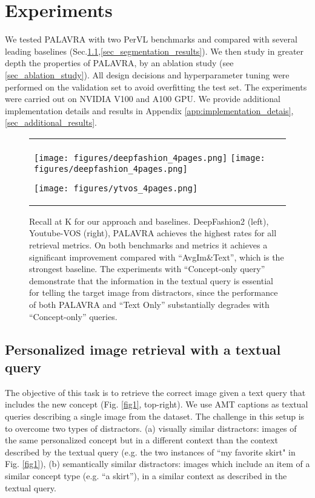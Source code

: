 \documentclass[runningheads]{llncs}
\newcommand{\figref}[1]{Fig. \ref{#1}}
\newcommand{\PerVL}{PerVL {}}
\begin{document}
\section{Experiments}
\label{sec_experiments}
We tested PALAVRA with two \PerVL benchmarks and compared with several leading baselines (Sec.\ref{sec_retrieval_results},\ref{sec_segmentation_results}). We then study in greater depth the properties of PALAVRA, by an ablation study (see \ref{sec_ablation_study}). All design decisions and hyperparameter tuning were performed on the validation set to avoid overfitting the test set. The experiments were carried out on NVIDIA V100 and A100 GPU. We provide additional implementation details and results in Appendix \ref{app:implementation_detais},\ref{sec_additional_results}.


\begin{figure*}[t]
\begin{tabular}{ll}
\texttt{[image: figures/deepfashion\_4pages.png]} \texttt{[image: figures/deepfashion\_4pages.png]} 

\texttt{[image: figures/ytvos\_4pages.png]}&
\end{tabular}
\caption{Recall at K for our approach and baselines.  DeepFashion2 (left), Youtube-VOS (right),
    PALAVRA achieves the highest rates for all retrieval metrics. On both benchmarks and metrics it achieves a significant improvement  compared with ``AvgIm\&Text'', which is the strongest baseline.
    The experiments with ``Concept-only query''  demonstrate that the information in the textual query is essential for telling the target image from distractors, since the performance of both PALAVRA and ``Text Only'' substantially degrades with ``Concept-only'' queries. }
\label{fig_recall_at_k}
\end{figure*}

\subsection{Personalized image retrieval with a textual query}
\label{sec_retrieval_results}
The objective of this task is to retrieve the correct image given a text query that includes the new concept (\figref{fig1}, top-right). We use AMT captions as textual queries describing a single image from the dataset. The challenge in this setup is to overcome two types of distractors. (a) visually similar distractors: images of the same personalized concept but in a different context than the context described by the textual query (e.g. the two instances of ``my favorite skirt" in \figref{fig1}), (b) semantically similar distractors: images which include an item of a similar concept type (e.g. ``a skirt''), in a similar context as described in the textual query.
\end{document}

